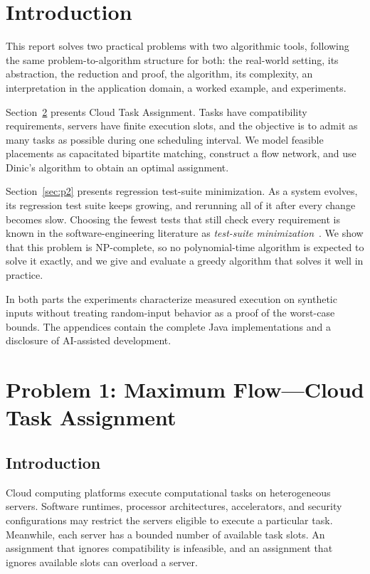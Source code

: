\documentclass[conference]{IEEEtran}
\theoremstyle{definition}
\theoremstyle{remark}
\begin{document}
\section{Introduction}
This report solves two practical problems with two algorithmic tools,
following the same problem-to-algorithm structure for both: the real-world
setting, its abstraction, the reduction and proof, the algorithm, its
complexity, an interpretation in the application domain, a worked example,
and experiments.

Section~\ref{sec:cloud-problem} presents Cloud Task Assignment. Tasks have
compatibility requirements, servers have finite execution slots, and the
objective is to admit as many tasks as possible during one scheduling
interval. We model feasible placements as capacitated bipartite matching,
construct a flow network, and use Dinic's algorithm to obtain an optimal
assignment.

Section~\ref{sec:p2} presents regression test-suite minimization. As a
system evolves, its regression test suite keeps growing, and rerunning all of
it after every change becomes slow. Choosing the fewest tests that still check
every requirement is known in the software-engineering literature as
\emph{test-suite minimization}~\cite{harrold1993,yoo2012}. We show that this
problem is NP-complete, so no polynomial-time algorithm is expected to solve it
exactly, and we give and evaluate a greedy algorithm that solves it well in
practice.

In both parts the experiments characterize measured execution on synthetic
inputs without treating random-input behavior as a proof of the worst-case
bounds. The appendices contain the complete Java implementations and a
disclosure of AI-assisted development.

\section{Problem 1: Maximum Flow---Cloud Task Assignment}
\label{sec:cloud-problem}
\subsection{Introduction}
Cloud computing platforms execute computational tasks on heterogeneous
servers. Software runtimes, processor architectures, accelerators, and
security configurations may restrict the servers eligible to execute a
particular task. Meanwhile, each server has a bounded number of available
task slots. An assignment that ignores compatibility is infeasible, and
an assignment that ignores available slots can overload a server.
\end{document}

